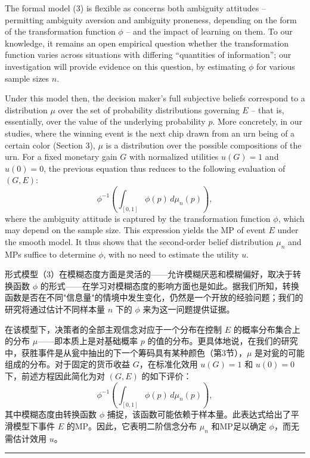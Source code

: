 \documentclass[12pt,a4paper]{article}
\newenvironment{original}
  {\par\vspace{0.5em}\noindent\color{black}\ignorespaces}
  {\par\vspace{0.3em}}
\newenvironment{translation}
  {\par\noindent\color{transblue}\ignorespaces}
  {\par\vspace{0.8em}\hrule\vspace{0.5em}}
\begin{document}
\begin{original}
The formal model (3) is flexible as concerns both ambiguity attitudes -- permitting ambiguity aversion and ambiguity proneness, depending on the form of the transformation function $\phi$ -- and the impact of learning on them. To our knowledge, it remains an open empirical question whether the transformation function varies across situations with differing ``quantities of information''; our investigation will provide evidence on this question, by estimating $\phi$ for various sample sizes $n$.

Under this model then, the decision maker's full subjective beliefs correspond to a distribution $\mu$ over the set of probability distributions governing $E$ -- that is, essentially, over the value of the underlying probability $p$. More concretely, in our studies, where the winning event is the next chip drawn from an urn being of a certain color (Section 3), $\mu$ is a distribution over the possible compositions of the urn. For a fixed monetary gain $G$ with normalized utilities $u(G) = 1$ and $u(0) = 0$, the previous equation thus reduces to the following evaluation of $(G, E)$:
\begin{equation}
\phi^{-1}\left( \int_{[0,1]} \phi(p)\, d\mu_n(p) \right), \label{eq:smooth_simple}
\end{equation}
where the ambiguity attitude is captured by the transformation function $\phi$, which may depend on the sample size. This expression yields the MP of event $E$ under the smooth model. It thus shows that the second-order belief distribution $\mu_n$ and MPs suffice to determine $\phi$, with no need to estimate the utility $u$.
\end{original}

\begin{translation}
形式模型（3）在模糊态度方面是灵活的——允许模糊厌恶和模糊偏好，取决于转换函数 $\phi$ 的形式——在学习对模糊态度的影响方面也是如此。据我们所知，转换函数是否在不同"信息量"的情境中发生变化，仍然是一个开放的经验问题；我们的研究将通过估计不同样本量 $n$ 下的 $\phi$ 来为这一问题提供证据。

在该模型下，决策者的全部主观信念对应于一个分布在控制 $E$ 的概率分布集合上的分布 $\mu$——即本质上是对基础概率 $p$ 的值的分布。更具体地说，在我们的研究中，获胜事件是从瓮中抽出的下一个筹码具有某种颜色（第3节），$\mu$ 是对瓮的可能组成的分布。对于固定的货币收益 $G$，在标准化效用 $u(G) = 1$ 和 $u(0) = 0$ 下，前述方程因此简化为对 $(G, E)$ 的如下评价：
\begin{equation}
\phi^{-1}\left( \int_{[0,1]} \phi(p)\, d\mu_n(p) \right),
\end{equation}
其中模糊态度由转换函数 $\phi$ 捕捉，该函数可能依赖于样本量。此表达式给出了平滑模型下事件 $E$ 的MP。因此，它表明二阶信念分布 $\mu_n$ 和MP足以确定 $\phi$，而无需估计效用 $u$。
\end{translation}
\end{document}
